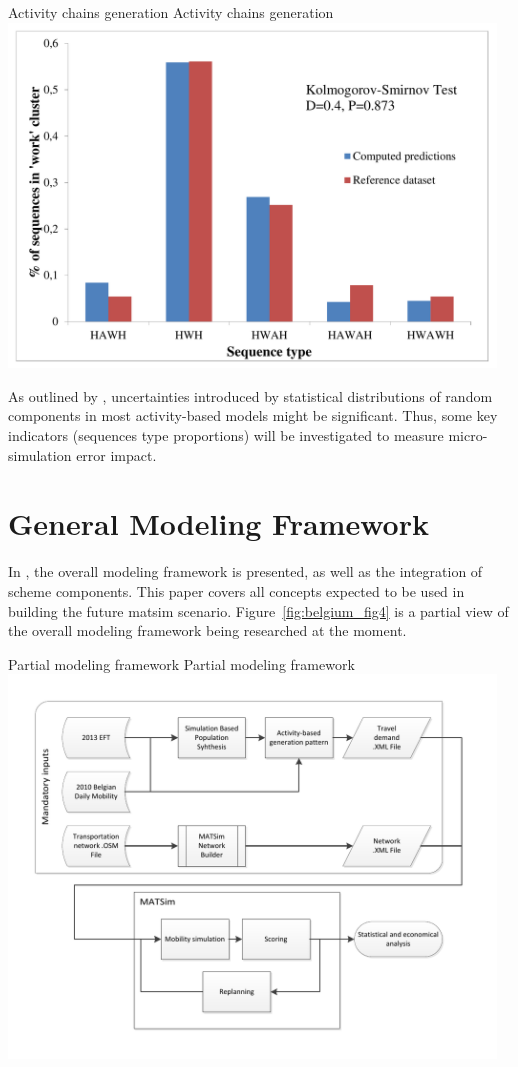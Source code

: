 \createfigure%
{Activity chains generation}%
{Activity chains generation}%
{\label{fig:belgium_fig3}}%
{\includegraphics[width=0.97\textwidth, angle=0]{scenarios/figures/belgium_fig3.pdf}}%
{}

As outlined by \citet[][]{CoolsEtAl_TRB_2011}, uncertainties introduced by statistical distributions of random components in most activity-based models might be significant. 
Thus, some key indicators (\eg sequences type proportions) will be investigated to measure micro-simulation error impact.

\section{General Modeling Framework}
In \citet[][]{SaadiEtAl_ICTTE_2014}, the overall modeling framework is presented, as well as the integration of scheme components. 
This paper covers all concepts expected to be used in building the future \gls{matsim} scenario. 
Figure~\ref{fig:belgium_fig4} is a partial view of the overall modeling framework being researched at the moment.

\createfigure%
{Partial modeling framework}%
{Partial modeling framework}%
{\label{fig:belgium_fig4}}%
{\includegraphics[width=0.97\textwidth, angle=0]{scenarios/figures/belgium_fig4.pdf}}%
{}


